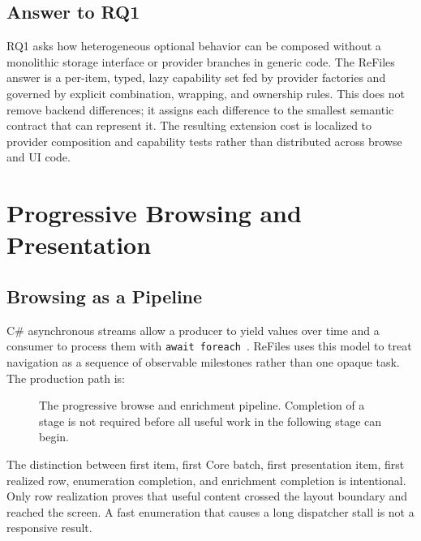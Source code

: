 \documentclass[10pt,a4paper,twoside]{article}
\begin{document}
\subsection{Answer to RQ1}

RQ1 asks how heterogeneous optional behavior can be composed without a monolithic storage interface or provider
branches in generic code. The ReFiles answer is a per-item, typed, lazy capability set fed by provider factories
and governed by explicit combination, wrapping, and ownership rules. This does not remove backend differences;
it assigns each difference to the smallest semantic contract that can represent it. The resulting extension cost
is localized to provider composition and capability tests rather than distributed across browse and UI code.

\section{Progressive Browsing and Presentation}
\label{section:browsing}

\subsection{Browsing as a Pipeline}

C\# asynchronous streams allow a producer to yield values over time and a consumer to process them with
\texttt{await foreach}~\cite{dotnet-async-streams}. ReFiles uses this model to treat navigation as a sequence of
observable milestones rather than one opaque task. The production path is:

\begin{figure}[htbp]
  \centering
  \caption{The progressive browse and enrichment pipeline. Completion of a stage is not required before all
  useful work in the following stage can begin.}
  \label{figure:browse-pipeline}
\end{figure}

The distinction between first item, first Core batch, first presentation item, first realized row, enumeration
completion, and enrichment completion is intentional. Only row realization proves that useful content crossed
the layout boundary and reached the screen. A fast enumeration that causes a long dispatcher stall is not a
responsive result.
\end{document}
